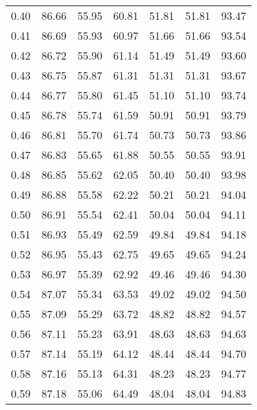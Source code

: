 \begin{tabular}{|c|c|c|c|c|c|c|}
      0.40 &     86.66 &     55.95 &      60.81 &   51.81 &      51.81 &         93.47 \\
      0.41 &     86.69 &     55.93 &      60.97 &   51.66 &      51.66 &         93.54 \\
      0.42 &     86.72 &     55.90 &      61.14 &   51.49 &      51.49 &         93.60 \\
      0.43 &     86.75 &     55.87 &      61.31 &   51.31 &      51.31 &         93.67 \\
      0.44 &     86.77 &     55.80 &      61.45 &   51.10 &      51.10 &         93.74 \\
      0.45 &     86.78 &     55.74 &      61.59 &   50.91 &      50.91 &         93.79 \\
      0.46 &     86.81 &     55.70 &      61.74 &   50.73 &      50.73 &         93.86 \\
      0.47 &     86.83 &     55.65 &      61.88 &   50.55 &      50.55 &         93.91 \\
      0.48 &     86.85 &     55.62 &      62.05 &   50.40 &      50.40 &         93.98 \\
      0.49 &     86.88 &     55.58 &      62.22 &   50.21 &      50.21 &         94.04 \\
      0.50 &     86.91 &     55.54 &      62.41 &   50.04 &      50.04 &         94.11 \\
      0.51 &     86.93 &     55.49 &      62.59 &   49.84 &      49.84 &         94.18 \\
      0.52 &     86.95 &     55.43 &      62.75 &   49.65 &      49.65 &         94.24 \\
      0.53 &     86.97 &     55.39 &      62.92 &   49.46 &      49.46 &         94.30 \\
      0.54 &     87.07 &     55.34 &      63.53 &   49.02 &      49.02 &         94.50 \\
      0.55 &     87.09 &     55.29 &      63.72 &   48.82 &      48.82 &         94.57 \\
      0.56 &     87.11 &     55.23 &      63.91 &   48.63 &      48.63 &         94.63 \\
      0.57 &     87.14 &     55.19 &      64.12 &   48.44 &      48.44 &         94.70 \\
      0.58 &     87.16 &     55.13 &      64.31 &   48.23 &      48.23 &         94.77 \\
      0.59 &     87.18 &     55.06 &      64.49 &   48.04 &      48.04 &         94.83 \\

\end{tabular}
